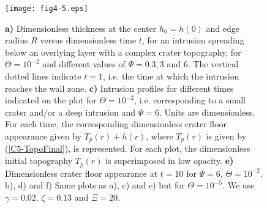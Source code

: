 \begin{figure}[h!]
  \graphicspath{ {/Users/thorey/Documents/These/Submission/Article/FFC_JGR_2013/Paper_APRES_2nd_REVIEW/} }
  \centering
  \noindent\texttt{[image: fig4-5.eps]}
  \caption{   \textbf{a)}  Dimensionless   thickness  at   the  center
    $h_0=h(0)$ and edge radius $R$  versus dimensionless time $t$, for
    an intrusion  spreading below  an overlying  layer with  a complex
    crater topography,  for $\Theta=10^{-2}$  and different  values of
    $\Psi=0.3, 3$ and  $6$. The vertical dotted  lines indicate $t=1$,
    i.e.   the   time  at  which   the  intrusion  reaches   the  wall
    zone. \textbf{c)} Intrusion profiles for different times indicated
    on the  plot for $\Theta=10^{-2}$,  i.e. corresponding to  a small
    crater  and/or   a  deep   intrusion  and  $\Psi=6$.    Units  are
    dimensionless.   For each  time,  the corresponding  dimensionless
    crater floor appearance given  by $T_p(r)+h(r)$, where $T_p(r)$ is
    given by (\ref{C5-TopoFinal}), is represented.  For each plot, the
    dimensionless initial  topography $T_p(r)$ is superimposed  in low
    opacity.   \textbf{e)} Dimensionless  crater  floor appearance  at
    $t=10$ for $\Psi=6$, $\Theta=10^{-2}$. b), d) and f) Same plots as
    a), c)  and e)  but for  $\Theta=10^{-5}$.  We  use $\gamma=0.02$,
    $\zeta=0.13$ and $\Xi=20$.}
  \label{C5-fig4-5}
\end{figure}

